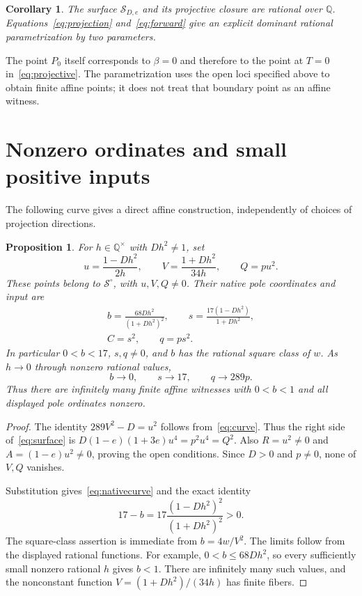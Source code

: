\documentclass[11pt,a4paper]{article}
\newtheorem{proposition}[theorem]{Proposition}
\newtheorem{corollary}[theorem]{Corollary}
\theoremstyle{remark}\newtheorem{remark}[theorem]{Remark}
\newcommand{\Q}{\mathbb Q}\newcommand{\PP}{\mathbb P}
\begin{document}
\begin{corollary}\label{cor:rational}
The surface $\mathcal S_{D,e}$ and its projective closure are rational
over $\Q$. Equations~\eqref{eq:projection} and~\eqref{eq:forward}
give an explicit dominant rational parametrization by two parameters.
\end{corollary}

The point $P_0$ itself corresponds to $\beta=0$ and therefore to
the point at $T=0$ in~\eqref{eq:projective}. The parametrization uses
the open loci specified above to obtain finite affine points; it does
not treat that boundary point as an affine witness.

\section{Nonzero ordinates and small positive inputs}
The following curve gives a direct affine construction, independently
of choices of projection directions.

\begin{proposition}\label{prop:curve}
For $h\in\Q^\times$ with $Dh^2\ne1$, set
\begin{equation}\label{eq:curve}
 u=\frac{1-Dh^2}{2h},\qquad
 V=\frac{1+Dh^2}{34h},\qquad Q=p u^2.
\end{equation}
These points belong to $\mathcal S^\circ$, with $u,V,Q\ne0$.
Their native pole coordinates and input are
\begin{equation}\label{eq:nativecurve}
 \begin{gathered}
 b=\frac{68Dh^2}{(1+Dh^2)^2},\qquad
 s=\frac{17(1-Dh^2)}{1+Dh^2},\\
 C=s^2,\qquad q=p s^2.
 \end{gathered}
\end{equation}
In particular $0<b<17$, $s,q\ne0$, and $b$ has the rational square
class of $w$. As $h\to0$ through nonzero rational values,
\[
                 b\longrightarrow0,\qquad
                 s\longrightarrow17,\qquad q\longrightarrow289p.
\]
Thus there are infinitely many finite affine witnesses with $0<b<1$
and all displayed pole ordinates nonzero.
\end{proposition}

\begin{proof}
The identity $289V^2-D=u^2$ follows from~\eqref{eq:curve}.
Thus the right side of~\eqref{eq:surface} is
$D(1-e)(1+3e)u^4=p^2u^4=Q^2$. Also
$R=u^2\ne0$ and $A=(1-e)u^2\ne0$, proving the open conditions.
Since $D>0$ and $p\ne0$, none of $V,Q$ vanishes.

Substitution gives~\eqref{eq:nativecurve} and the exact identity
\[
             17-b=17\frac{(1-Dh^2)^2}{(1+Dh^2)^2}>0.
\]
The square-class assertion is immediate from $b=4w/V^2$.
The limits follow from the displayed rational functions. For example,
$0<b\le68Dh^2$, so every sufficiently small nonzero rational $h$
gives $b<1$. There are infinitely many such values, and the nonconstant
function $V=(1+Dh^2)/(34h)$ has finite fibers.
\end{proof}
\end{document}
